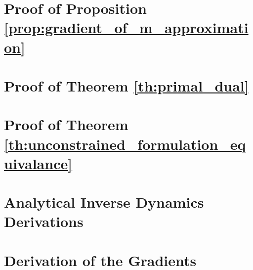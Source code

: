 \section{Proof of Proposition \ref{prop:gradient_of_m_approximation}}
\label{app:gradient_of_m_approximation}


\section{Proof of Theorem \ref{th:primal_dual}}
\label{app:primal_dual_proof}


\section{Proof of Theorem \ref{th:unconstrained_formulation_equivalance}}
\label{app:unconstrained_formulation_equivalance}


\section{Analytical Inverse Dynamics Derivations}
\label{app:analytical_inverse_dynamics_derivations}


\section{Derivation of the Gradients}
\label{app:gradients_derivation}

